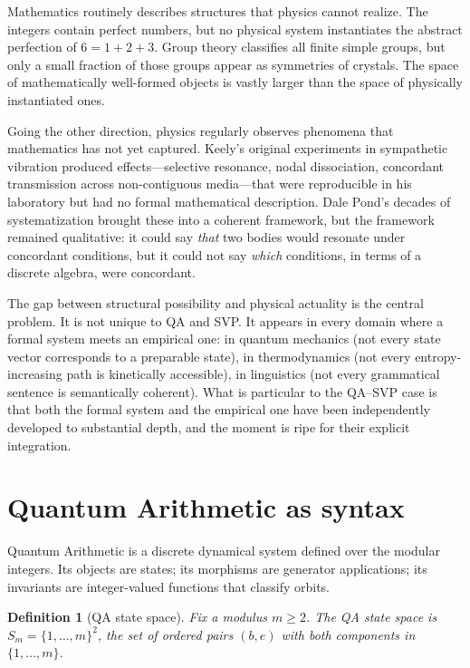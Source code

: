 \documentclass[11pt,a4paper]{article}
\newtheorem{definition}[theorem]{Definition}
\begin{document}
Mathematics routinely describes structures that physics cannot realize.
The integers contain perfect numbers, but no physical system instantiates
the abstract perfection of $6 = 1 + 2 + 3$. Group theory classifies all
finite simple groups, but only a small fraction of those groups appear as
symmetries of crystals. The space of mathematically well-formed objects is
vastly larger than the space of physically instantiated ones.

Going the other direction, physics regularly observes phenomena that
mathematics has not yet captured. Keely's original experiments in
sympathetic vibration produced effects---selective resonance, nodal
dissociation, concordant transmission across non-contiguous
media---that were reproducible in his laboratory but had no formal
mathematical description. Dale Pond's decades of systematization brought
these into a coherent framework, but the framework remained qualitative:
it could say \emph{that} two bodies would resonate under concordant
conditions, but it could not say \emph{which} conditions, in terms of a
discrete algebra, were concordant.

The gap between structural possibility and physical actuality is the
central problem. It is not unique to QA and SVP. It appears in every
domain where a formal system meets an empirical one: in quantum mechanics
(not every state vector corresponds to a preparable state), in
thermodynamics (not every entropy-increasing path is kinetically
accessible), in linguistics (not every grammatical sentence is
semantically coherent). What is particular to the QA--SVP case is that
both the formal system and the empirical one have been independently
developed to substantial depth, and the moment is ripe for their explicit
integration.

\section{Quantum Arithmetic as syntax}

Quantum Arithmetic is a discrete dynamical system defined over the modular
integers. Its objects are states; its morphisms are generator applications;
its invariants are integer-valued functions that classify orbits.

\begin{definition}[QA state space]
Fix a modulus $m \geq 2$. The QA state space is
$S_m = \{1, \ldots, m\}^2$,
the set of ordered pairs $(b, e)$ with both components in $\{1, \ldots, m\}$.
\end{definition}
\end{document}
